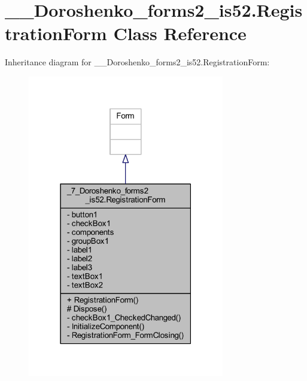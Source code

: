 \hypertarget{class__7___doroshenko__forms2__is52_1_1_registration_form}{}\section{\+\_\+\_\+\+Doroshenko\+\_\+forms2\+\_\+is52.\+Registration\+Form Class Reference}
\label{class__7___doroshenko__forms2__is52_1_1_registration_form}


Inheritance diagram for \+\_\+\_\+\+Doroshenko\+\_\+forms2\+\_\+is52.\+Registration\+Form\+:
\nopagebreak
\begin{figure}[H]
\begin{center}
\leavevmode
\includegraphics[width=243pt]{class__7___doroshenko__forms2__is52_1_1_registration_form__inherit__graph}
\end{center}
\end{figure}


